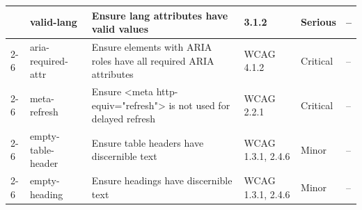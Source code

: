 \documentclass[sigconf, nonacm]{acmart}
\begin{document}
\begin{table}
{\begin{tabular}{|p{1.8cm}|p{2cm}|p{7cm}|p{1.5cm}|p{1.5cm}|p{2.7cm}|}
& valid-lang      &       Ensure lang attributes have valid values      &    3.1.2       &  Serious  &  -- \\ \cline{2-6}

& aria-required-attr      &      Ensure elements with ARIA roles have all required ARIA attributes       &      WCAG 4.1.2       &  Critical   &  -- \\ \cline{2-6}

& meta-refresh      &       Ensure <meta http-equiv="refresh"> is not used for delayed refresh      &      WCAG 2.2.1       & Critical &  -- \\ \cline{2-6}

& empty-table-header      & Ensure table headers have discernible text            &   WCAG 1.3.1, 2.4.6          &  Minor & -- \\ \cline{2-6}

& empty-heading      &  Ensure headings have discernible text           &      WCAG 1.3.1, 2.4.6       & Minor  & -- \\ \hline

\end{tabular}
\label{tab:important_violations}}
\end{table}
\end{document}
